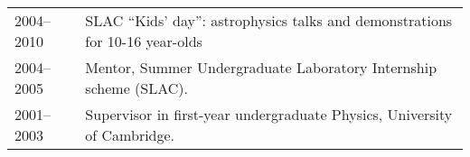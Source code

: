 \begin{tabular}{@{}p{2.5cm}p{15.5cm}}
2004--2010  & SLAC ``Kids' day'': astrophysics talks and demonstrations for 10-16 year-olds\\
2004--2005  & Mentor, Summer Undergraduate Laboratory Internship scheme (SLAC).\\
2001--2003  & Supervisor in first-year undergraduate Physics, University of Cambridge.\\
\end{tabular}
